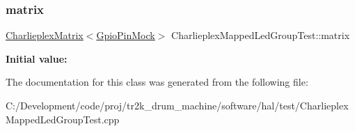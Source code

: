 \subsubsection{\texorpdfstring{matrix}{matrix}}
{\footnotesize\ttfamily \mbox{\hyperlink{class_charlieplex_matrix}{Charlieplex\+Matrix}}$<$\mbox{\hyperlink{class_gpio_pin_mock}{Gpio\+Pin\+Mock}}$>$ Charlieplex\+Mapped\+Led\+Group\+Test\+::matrix}

{\bfseries Initial value\+:}
\begin{DoxyCode}{0}
\DoxyCodeLine{=}

\end{DoxyCode}


The documentation for this class was generated from the following file\+:\begin{DoxyCompactItemize}
\item 
C\+:/\+Development/code/proj/tr2k\+\_\+drum\+\_\+machine/software/hal/test/Charlieplex\+Mapped\+Led\+Group\+Test.\+cpp\end{DoxyCompactItemize}
